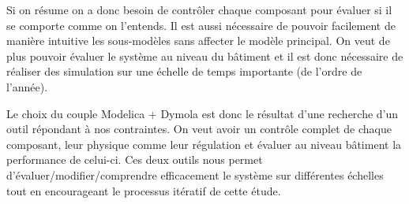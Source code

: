 Si on résume on a donc besoin de contrôler chaque composant pour évaluer si il se
comporte comme on l’entends. Il est aussi nécessaire de pouvoir facilement de manière
intuitive les sous-modèles sans affecter le modèle principal. On veut de plus pouvoir
évaluer le système au niveau du bâtiment et il est donc nécessaire de réaliser des
simulation sur une échelle de temps importante (de l’ordre de l’année).


Le choix du couple Modelica + Dymola est donc le résultat d’une recherche d’un outil
répondant à nos contraintes. On veut avoir un contrôle complet de chaque composant, leur
physique comme leur régulation et évaluer au niveau bâtiment la performance de celui-ci.
Ces deux outils nous permet d’évaluer/modifier/comprendre efficacement le système
sur différentes échelles tout en encourageant le processus itératif de cette étude.



